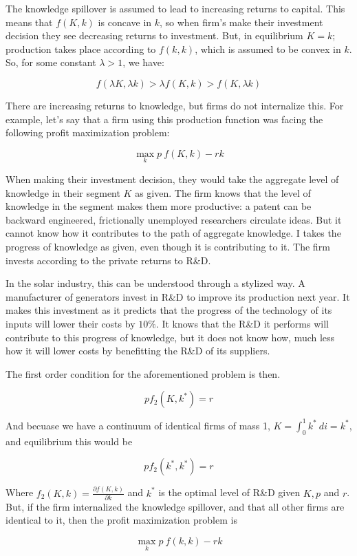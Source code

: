 \documentclass{article}
\begin{document}
 
The knowledge spillover is assumed to lead to increasing returns to capital. This means that $f(K,k)$ is concave in $k$, so when firm's make their investment decision they see decreasing returns to investment. But, in equilibrium $K=k$; production takes place according to $f(k,k)$, which is assumed to be convex in $k$. So, for some constant $\lambda>1$, we have:


\[
f(\lambda K, \lambda k) > \lambda f(K, k) > f(K, \lambda k) 
\]

There are increasing returns to knowledge, but firms do not internalize this. For example, let's say that a firm using this production function was facing the following profit maximization problem:

\[
\max_k p\:f(K,k) - rk
\]

When making their investment decision, they would take the aggregate level of knowledge in their segment $K$ as given. The firm knows that the level of knowledge in the segment makes them more productive: a patent can be backward engineered, frictionally unemployed researchers circulate ideas. But it cannot know how it contributes to the path of aggregate knowledge. I takes the progress of knowledge as given, even though it is contributing to it. The firm invests according to the private returns to R\&D. 

In the solar industry, this can be understood through a stylized way. A manufacturer of generators invest in R\&D to improve its production next year. It makes this investment as it predicts that the progress of the technology of its inputs will lower their costs by $10\%$. It knows that the R\&D it performs will contribute to this progress of knowledge, but it does not know how, much less how it will lower costs by benefitting the R\&D of its suppliers.

The first order condition for the aforementioned problem is then.

\[
p f_2(K,k^*) = r
\]

And becuase we have a continuum of identical firms of mass 1, $K = \int_0^1 k^* ~ di = k^*$, and equilibrium this would be

\[
p f_2(k^*,k^*) = r
\]

Where $f_2(K,k) = \frac{\partial f(K,k)}{\partial k}$ and $k^*$ is the optimal level of R\&D given $K, p$ and $r$. But, if the firm internalized the knowledge spillover, and that all other firms are identical to it, then the profit maximization problem is

\[
\max_k p\:f(k,k) - rk
\]
\end{document}
